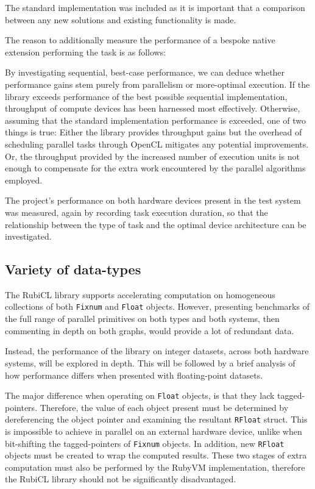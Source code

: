 The standard implementation was included as it is important that a comparison between any new solutions and existing functionality is made.

The reason to additionally measure the performance of a bespoke native extension performing the task is as follows:

By investigating sequential, best-case performance, we can deduce whether performance gains stem purely from parallelism or more-optimal execution. If the library exceeds performance of the best possible sequential implementation, throughput of compute devices has been harnessed most effectively. Otherwise, assuming that the standard implementation performance is exceeded, one of two things is true: Either the library provides throughput gains but the overhead of scheduling parallel tasks through \ac{OpenCL} mitigates any potential improvements. Or, the throughput provided by the increased number of execution units is not enough to compensate for the extra work encountered by the parallel algorithms employed.

The project's performance on both hardware devices present in the test system was measured, again by recording task execution duration, so that the relationship between the type of task and the optimal device architecture can be investigated.



\subsection{Variety of data-types}
The RubiCL library supports accelerating computation on homogeneous collections of both \verb|Fixnum| and \verb|Float| objects.
However, presenting benchmarks of the full range of parallel primitives on both types and both systems, then commenting in depth on both graphs, would provide a lot of redundant data.

Instead, the performance of the library on integer datasets, across both hardware systems, will be explored in depth.
This will be followed by a brief analysis of how performance differs when presented with floating-point datasets.

 The major difference when operating on \verb|Float| objects, is that they lack tagged-pointers. Therefore, the value of each object present must be determined by dereferencing the object pointer and examining the resultant \verb|RFloat| struct. This is impossible to achieve in parallel on an external hardware device, unlike when bit-shifting the tagged-pointers of \verb|Fixnum| objects. In addition,  new \verb|RFloat| objects must be created to wrap the computed results.
 These two stages of extra computation must also be performed by the RubyVM implementation, therefore the RubiCL library should not be significantly disadvantaged.

